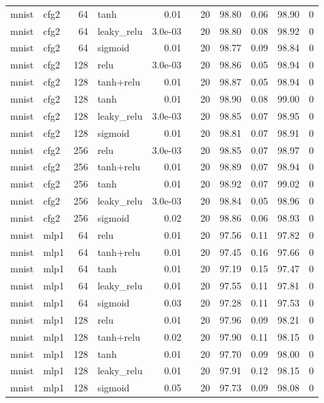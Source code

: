 \begin{table}[htbp]
{\begin{tabular}{@{}llrlrlrrrrr@{}}
mnist & cfg2 & 64 & tanh & 0.01 &  & 20 & 98.80 & 0.06 & 98.90 & 0 \\
mnist & cfg2 & 64 & leaky\_relu & 3.0e-03 &  & 20 & 98.80 & 0.08 & 98.92 & 0 \\
mnist & cfg2 & 64 & sigmoid & 0.01 &  & 20 & 98.77 & 0.09 & 98.84 & 0 \\
mnist & cfg2 & 128 & relu & 3.0e-03 &  & 20 & 98.86 & 0.05 & 98.94 & 0 \\
mnist & cfg2 & 128 & tanh+relu & 0.01 &  & 20 & 98.87 & 0.05 & 98.94 & 0 \\
mnist & cfg2 & 128 & tanh & 0.01 &  & 20 & 98.90 & 0.08 & 99.00 & 0 \\
mnist & cfg2 & 128 & leaky\_relu & 3.0e-03 &  & 20 & 98.85 & 0.07 & 98.95 & 0 \\
mnist & cfg2 & 128 & sigmoid & 0.01 &  & 20 & 98.81 & 0.07 & 98.91 & 0 \\
mnist & cfg2 & 256 & relu & 3.0e-03 &  & 20 & 98.85 & 0.07 & 98.97 & 0 \\
mnist & cfg2 & 256 & tanh+relu & 0.01 &  & 20 & 98.89 & 0.07 & 98.94 & 0 \\
mnist & cfg2 & 256 & tanh & 0.01 &  & 20 & 98.92 & 0.07 & 99.02 & 0 \\
mnist & cfg2 & 256 & leaky\_relu & 3.0e-03 &  & 20 & 98.84 & 0.05 & 98.96 & 0 \\
mnist & cfg2 & 256 & sigmoid & 0.02 &  & 20 & 98.86 & 0.06 & 98.93 & 0 \\
mnist & mlp1 & 64 & relu & 0.01 &  & 20 & 97.56 & 0.11 & 97.82 & 0 \\
mnist & mlp1 & 64 & tanh+relu & 0.01 &  & 20 & 97.45 & 0.16 & 97.66 & 0 \\
mnist & mlp1 & 64 & tanh & 0.01 &  & 20 & 97.19 & 0.15 & 97.47 & 0 \\
mnist & mlp1 & 64 & leaky\_relu & 0.01 &  & 20 & 97.55 & 0.11 & 97.81 & 0 \\
mnist & mlp1 & 64 & sigmoid & 0.03 &  & 20 & 97.28 & 0.11 & 97.53 & 0 \\
mnist & mlp1 & 128 & relu & 0.01 &  & 20 & 97.96 & 0.09 & 98.21 & 0 \\
mnist & mlp1 & 128 & tanh+relu & 0.02 &  & 20 & 97.90 & 0.11 & 98.15 & 0 \\
mnist & mlp1 & 128 & tanh & 0.01 &  & 20 & 97.70 & 0.09 & 98.00 & 0 \\
mnist & mlp1 & 128 & leaky\_relu & 0.01 &  & 20 & 97.91 & 0.12 & 98.15 & 0 \\
mnist & mlp1 & 128 & sigmoid & 0.05 &  & 20 & 97.73 & 0.09 & 98.08 & 0 \\

\end{tabular}}
\end{table}
